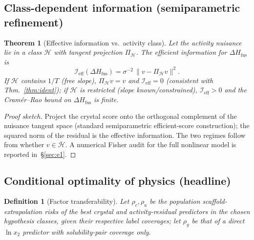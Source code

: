 \documentclass[11pt]{article}
\newtheorem{theorem}{Theorem}
\newtheorem{definition}{Definition}
\newcommand{\lnx}{\ln x_2}
\newcommand{\dHfus}{\Delta H_{\mathrm{fus}}}
\begin{document}
\subsection{Class-dependent information (semiparametric refinement)}
\begin{theorem}[Effective information vs.\ activity class]\label{thm:semiparam}
Let the activity nuisance lie in a class $\mathcal H$ with tangent projection
$\Pi_{\mathcal H}$. The efficient information for $\dHfus$ is
\begin{equation}
  \mathcal I_{\mathrm{eff}}(\dHfus)=\sigma^{-2}\,\big\|v-\Pi_{\mathcal H}v\big\|^2 .
\end{equation}
If $\mathcal H$ contains $1/T$ (free slope), $\Pi_{\mathcal H}v=v$ and
$\mathcal I_{\mathrm{eff}}=0$ (consistent with Thm.~\ref{thm:ident}); if
$\mathcal H$ is restricted (slope known/constrained), $\mathcal I_{\mathrm{eff}}>0$
and the Cram\'er--Rao bound on $\dHfus$ is finite.
\end{theorem}
\begin{proof}[Proof sketch]
Project the crystal score onto the orthogonal complement of the nuisance tangent
space (standard semiparametric efficient-score construction); the squared norm of
the residual is the effective information. The two regimes follow from whether
$v\in\overline{\mathcal H}$. A numerical Fisher audit for the full nonlinear
model is reported in~\S\ref{sec:e1}.
\end{proof}

\subsection{Conditional optimality of physics (headline)}
\begin{definition}[Factor transferability]
Let $\rho_c,\rho_a$ be the population scaffold-extrapolation risks of the best
crystal and activity-residual predictors in the chosen hypothesis classes, given
their respective label coverages; let $\rho_y$ be that of a direct $\lnx$
predictor with solubility-pair coverage only.
\end{definition}
\end{document}
